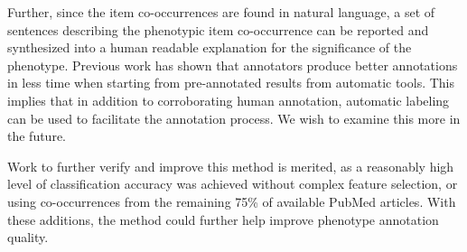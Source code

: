 \documentclass{sig-alternate-05-2015}
\begin{document}
Further, since the item co-occurrences are found in natural language, a set of sentences describing the phenotypic item co-occurrence can be reported and synthesized into a human readable explanation for the significance of the phenotype. 
Previous work \cite{neveol2011semi} has shown that annotators produce better annotations in less time when starting from pre-annotated results from automatic tools. 
This implies that in addition to corroborating human annotation, automatic labeling can be used to facilitate the annotation process. 
We wish to examine this more in the future.

Work to further verify and improve this method is merited, as a reasonably high level of classification accuracy was achieved without complex feature selection, or using co-occurrences from the remaining 75\% of available PubMed articles. With these additions, the method could further help improve phenotype annotation quality. 



%
%
%


\end{document}
